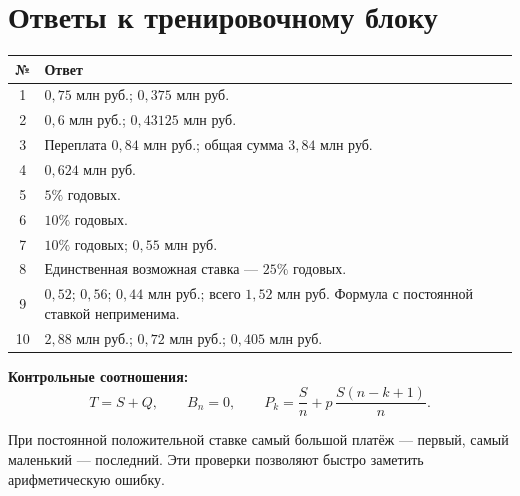 \documentclass[a4paper,12pt]{article}
\begin{document}
\section*{Ответы к тренировочному блоку}
\begin{center}
\renewcommand{\arraystretch}{1.55}
\begin{tabularx}{\linewidth}{@{}c >{\raggedright\arraybackslash}X@{}}
\toprule
№ & Ответ \\
\midrule
1 & $0{,}75$ млн руб.; $0{,}375$ млн руб. \\
2 & $0{,}6$ млн руб.; $0{,}43125$ млн руб. \\
3 & Переплата $0{,}84$ млн руб.; общая сумма $3{,}84$ млн руб. \\
4 & $0{,}624$ млн руб. \\
5 & $5\%$ годовых. \\
6 & $10\%$ годовых. \\
7 & $10\%$ годовых; $0{,}55$ млн руб. \\
8 & Единственная возможная ставка --- $25\%$ годовых. \\
9 & $0{,}52$; $0{,}56$; $0{,}44$ млн руб.; всего $1{,}52$ млн руб. Формула с постоянной ставкой неприменима. \\
10 & $2{,}88$ млн руб.; $0{,}72$ млн руб.; $0{,}405$ млн руб. \\
\bottomrule
\end{tabularx}
\end{center}

\vspace{6mm}
\textbf{Контрольные соотношения:}
\[
T=S+Q,\qquad B_n=0,\qquad
P_k=\frac Sn+p\,\frac{S(n-k+1)}n.
\]

При постоянной положительной ставке самый большой платёж --- первый, самый маленький --- последний. Эти проверки позволяют быстро заметить арифметическую ошибку.
\end{document}

